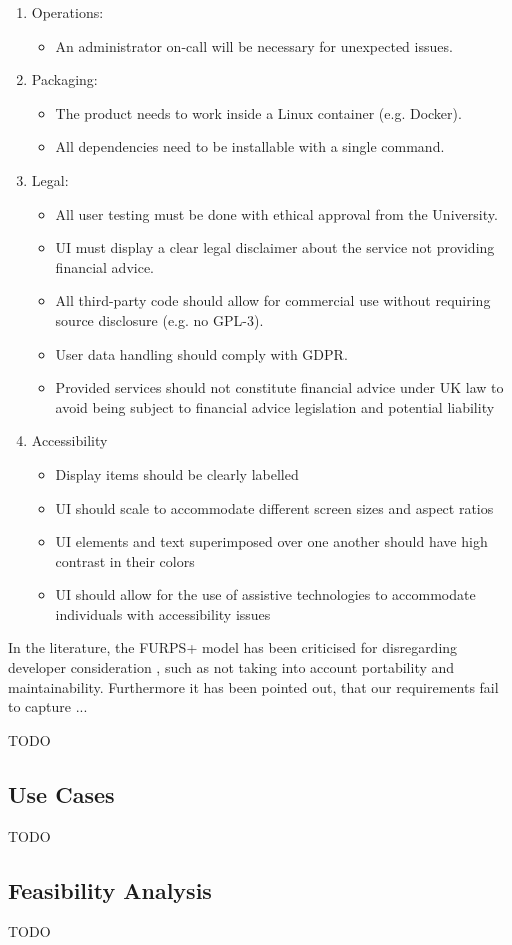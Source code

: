 \documentclass[main.tex]{subfiles}
\begin{document}
\begin{enumerate}
\begin{itemize}
   \end{itemize}
       \item Operations:
      \begin{itemize}
     \item An administrator on-call will be necessary for unexpected issues.
   \end{itemize}
          \item Packaging:
      \begin{itemize}
     \item The product needs to work inside a Linux container (e.g. Docker).
     \item All dependencies need to be installable with a single command.
   \end{itemize}
             \item Legal:
      \begin{itemize}
     \item All user testing must be done with ethical approval from the University.
     \item UI must display a clear legal disclaimer about the service not providing financial advice.
     \item All third-party code should allow for commercial use without requiring source disclosure (e.g. no GPL-3).
     \item User data handling should comply with GDPR.
     \item Provided services should not constitute financial advice under UK law to avoid being subject to financial advice legislation and potential liability
   \end{itemize}
        \item Accessibility
       \begin{itemize}
   \item Display items should be clearly labelled 
   \item UI should scale to accommodate different screen sizes and aspect ratios
   \item UI elements and text superimposed over one another should have high contrast in their colors
   \item UI should allow for the use of assistive technologies to accommodate individuals with accessibility issues
       \end{itemize}
\end{enumerate}

In the literature, the FURPS+ model has been criticised for disregarding developer consideration  \cite{FURPS_drawbacks}, such as not taking into account portability and maintainability. 
Furthermore it has been pointed out, that our requirements fail to capture ...

TODO

\subsection{Use Cases}
TODO
\subsection{Feasibility Analysis}
TODO
\end{document}
